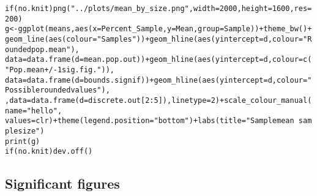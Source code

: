\documentclass{article}\usepackage[]{graphicx}\usepackage[]{color}
\makeatletter
\newcommand{\hlnum}[1]{\textcolor[rgb]{0.863,0.196,0.184}{#1}}%
\newcommand{\hlstr}[1]{\textcolor[rgb]{0.863,0.196,0.184}{#1}}%
\newcommand{\hlopt}[1]{\textcolor[rgb]{0.576,0.631,0.631}{#1}}%
\newcommand{\hlstd}[1]{\textcolor[rgb]{0.514,0.58,0.588}{#1}}%
\newcommand{\hlkwa}[1]{\textcolor[rgb]{0.796,0.294,0.086}{#1}}%
\newcommand{\hlkwb}[1]{\textcolor[rgb]{0.522,0.6,0}{#1}}%
\newcommand{\hlkwc}[1]{\textcolor[rgb]{0.796,0.294,0.086}{#1}}%
\newcommand{\hlkwd}[1]{\textcolor[rgb]{0.576,0.631,0.631}{#1}}%
\newenvironment{kframe}{%
 \def\at@end@of@kframe{}%
 \ifinner\ifhmode%
  \def\at@end@of@kframe{\end{minipage}}%
  \begin{minipage}{\columnwidth}%
 \fi\fi%
 \def\FrameCommand##1{\hskip\@totalleftmargin \hskip-\fboxsep
 \colorbox{shadecolor}{##1}\hskip-\fboxsep
     \hskip-\linewidth \hskip-\@totalleftmargin \hskip\columnwidth}%
 \MakeFramed {\advance\hsize-\width
   \@totalleftmargin\z@ \linewidth\hsize
   \@setminipage}}%
 {\par\unskip\endMakeFramed%
 \at@end@of@kframe}
\newenvironment{knitrout}{}{} %
\makeatother
\begin{document}
\begin{knitrout}
\color{fgcolor}\begin{kframe}
\begin{alltt}
\hlkwa{if} \hlstd{(no.knit)} \hlkwd{png}\hlstd{(}\hlstr{"../plots/mean_by_size.png"}\hlstd{,} \hlkwc{width} \hlstd{=} \hlnum{2000}\hlstd{,} \hlkwc{height} \hlstd{=} \hlnum{1600}\hlstd{,} \hlkwc{res} \hlstd{=} \hlnum{200}\hlstd{)}
\hlstd{g} \hlkwb{<-} \hlkwd{ggplot}\hlstd{(means,} \hlkwd{aes}\hlstd{(}\hlkwc{x} \hlstd{= Percent_Sample,} \hlkwc{y} \hlstd{= Mean,} \hlkwc{group} \hlstd{= Sample))} \hlopt{+} \hlkwd{theme_bw}\hlstd{()} \hlopt{+}
    \hlkwd{geom_line}\hlstd{(}\hlkwd{aes}\hlstd{(}\hlkwc{colour} \hlstd{=} \hlstr{"Samples"}\hlstd{))} \hlopt{+} \hlkwd{geom_hline}\hlstd{(}\hlkwd{aes}\hlstd{(}\hlkwc{yintercept} \hlstd{= d,} \hlkwc{colour} \hlstd{=} \hlstr{"Rounded pop. mean"}\hlstd{),}
    \hlkwc{data} \hlstd{=} \hlkwd{data.frame}\hlstd{(}\hlkwc{d} \hlstd{= mean.pop.out))} \hlopt{+} \hlkwd{geom_hline}\hlstd{(}\hlkwd{aes}\hlstd{(}\hlkwc{yintercept} \hlstd{= d,} \hlkwc{colour} \hlstd{=} \hlkwd{c}\hlstd{(}\hlstr{"Pop. mean +/- 1 sig. fig."}\hlstd{)),}
    \hlkwc{data} \hlstd{=} \hlkwd{data.frame}\hlstd{(}\hlkwc{d} \hlstd{= bounds.signif))} \hlopt{+} \hlkwd{geom_hline}\hlstd{(}\hlkwd{aes}\hlstd{(}\hlkwc{yintercept} \hlstd{= d,} \hlkwc{colour} \hlstd{=} \hlstr{"Possible rounded values"}\hlstd{),}
    \hlstd{,} \hlkwc{data} \hlstd{=} \hlkwd{data.frame}\hlstd{(}\hlkwc{d} \hlstd{= discrete.out[}\hlnum{2}\hlopt{:}\hlnum{5}\hlstd{]),} \hlkwc{linetype} \hlstd{=} \hlnum{2}\hlstd{)} \hlopt{+} \hlkwd{scale_colour_manual}\hlstd{(}\hlkwc{name} \hlstd{=} \hlstr{"hello"}\hlstd{,}
    \hlkwc{values} \hlstd{= clr)} \hlopt{+} \hlkwd{theme}\hlstd{(}\hlkwc{legend.position} \hlstd{=} \hlstr{"bottom"}\hlstd{)} \hlopt{+} \hlkwd{labs}\hlstd{(}\hlkwc{title} \hlstd{=} \hlstr{"Sample mean ~ sample size"}\hlstd{)}
\hlkwd{print}\hlstd{(g)}
\hlkwa{if} \hlstd{(no.knit)} \hlkwd{dev.off}\hlstd{()}
\end{alltt}
\end{kframe}
\end{knitrout}

\subsection{Significant figures}
\end{document}
